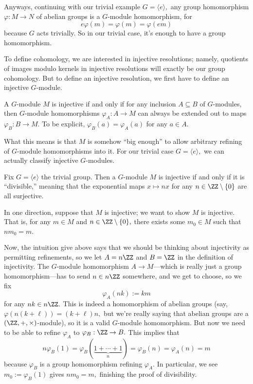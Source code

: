 Anyways, continuing with our trivial example $G=\langle e\rangle,$ any group homomorphism $\varphi:M\to N$ of abelian groups is a $G$-module homomorphism, for
\[e\varphi(m)=\varphi(m)=\varphi(em)\]
because $G$ acts trivially. So in our trivial case, it's enough to have a group homomorphism.

To define cohomology, we are interested in injective resolutions; namely, quotients of images modulo kernels in injective resolutions will exactly be our group cohomology. But to define an injective resolution, we first have to define an injective $G$-module.
\begin{definition}
    A $G$-module $M$ is injective if and only if for any inclusion $A\subseteq B$ of $G$-modules, then $G$-module homomorphisms $\varphi_A:A\to M$ can always be extended out to maps $\varphi_B:B\to M.$ To be explicit, $\varphi_B(a)=\varphi_A(a)$ for any $a\in A.$
\end{definition}
What this means is that $M$ is somehow ``big enough'' to allow arbitrary refining of $G$-module homomorphisms into it. For our trivial case $G=\langle e\rangle,$ we can actually classify injective $G$-modules.
\begin{proposition}
    Fix $G=\langle e\rangle$ the trivial group. Then a $G$-module $M$ is injective if and only if it is ``divisible,'' meaning that the exponential maps $x\mapsto nx$ for any $n\in\ZZ\setminus\{0\}$ are all surjective.
\end{proposition}
In one direction, suppose that $M$ is injective; we want to show $M$ is injective. That is, for any $m\in M$ and $n\in\ZZ\setminus\{0\},$ there exists some $m_0\in M$ such that $nm_0=m.$

Now, the intuition give above says that we should be thinking about injectivity as permitting refinements, so we let $A=n\ZZ$ and $B=\ZZ$ in the definition of injectivity. The $G$-module homomorphism $A\to M$---which is really just a group homomorphism---has to send $n\in n\ZZ$ somewhere, and we get to choose, so we fix
\[\varphi_A(nk):=km\]
for any $nk\in n\ZZ.$ This is indeed a homomorphism of abelian groups (say, $\varphi(n(k+\ell))=(k+\ell)n,$ but we're really saying that abelian groups are a $(\ZZ,+,\times)$-module), so it is a valid $G$-module homomorphism. But now we need to be able to refine $\varphi_A$ to $\varphi_B:\ZZ\to B.$ This implies that
\[n\varphi_B(1)=\varphi_B(\underbrace{1+\cdots+1}_n)=\varphi_B(n)=\varphi_A(n)=m\]
because $\varphi_B$ is a group homomorphism refining $\varphi_A.$ In particular, we see $m_0:=\varphi_B(1)$ gives $nm_0=m,$ finishing the proof of divisibility.

